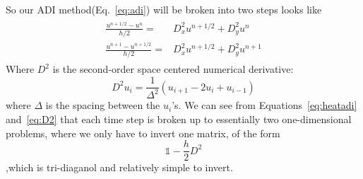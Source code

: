 \documentclass[paper=a4, fontsize=11pt, abstract=on]{scrartcl} %
\numberwithin{equation}{section}
\numberwithin{figure}{section}
\numberwithin{table}{section}
\begin{document}
So our ADI method(Eq.~\ref{eq:adi}) will be broken into two steps looks like
\begin{align}
\label{eq:heatadi}
  \begin{split}
    \frac{u^{n+1/2}-u^n}{h/2} =& D^2_xu^{n+1/2} + D^2_yu^n \\ 
    \frac{u^{n+1}-u^{n+1/2}}{h/2} =& D^2_xu^{n+1/2} + D^2_yu^{n+1}
  \end{split}
\end{align}
Where $D^2$ is the second-order space centered numerical derivative:
\begin{equation}
  \label{eq:D2}
  D^2u_i = \frac{1}{\Delta ^2}(u_{i+1} - 2u_i + u_{i-1})
\end{equation}
where $\Delta$ is the spacing between the $u_i$'s. We can see from Equations~\ref{eq:heatadi} and~\ref{eq:D2} that each time step is broken up to essentially two one-dimensional problems, where we only have to invert one matrix, of the form
\begin{equation}
  \label{eq:matrix}
  \mathbb{1}-\frac{h}{2}D^2
\end{equation}
,which is tri-diaganol and relatively simple to invert. 
\end{document}
